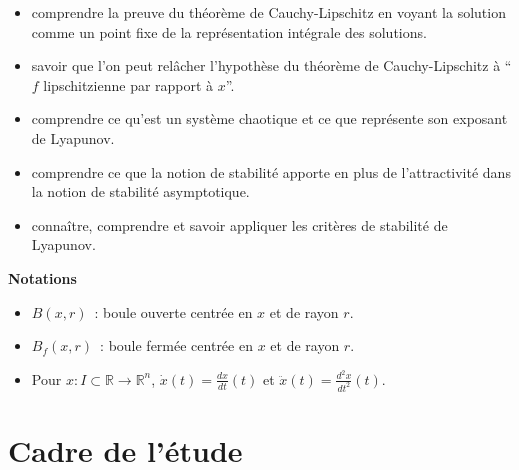 \begin{itemize}
\item
  comprendre la preuve du théorème de Cauchy-Lipschitz en voyant la
  solution comme un point fixe de la représentation intégrale des
  solutions.
\item
  savoir que l'on peut relâcher l'hypothèse du théorème de
  Cauchy-Lipschitz à ``\(f\) lipschitzienne par rapport à \(x\)''.
\item
  comprendre ce qu'est un système chaotique et ce que représente son
  exposant de Lyapunov.
\item
  comprendre ce que la notion de stabilité apporte en plus de
  l'attractivité dans la notion de stabilité asymptotique.
\item
  connaître, comprendre et savoir appliquer les critères de stabilité de
  Lyapunov.
\end{itemize}

\textbf{Notations}

\begin{itemize}
\item
  \(B(x,r)\)~: boule ouverte centrée en \(x\) et de rayon \(r\).
\item
  \(B_f(x,r)\)~: boule fermée centrée en \(x\) et de rayon \(r\).
\item
  Pour \(x:I\subset\mathbb{R}\to \mathbb{R}^n\),
  \(\dot{x}(t)=\frac{dx}{dt}(t)\) et
  \(\ddot{x}(t)=\frac{d^2x}{dt^2}(t)\).
\end{itemize}

\hypertarget{cadre-de-luxe9tude}{%
\chapter{Cadre de l'étude}\label{cadre-de-luxe9tude}}

